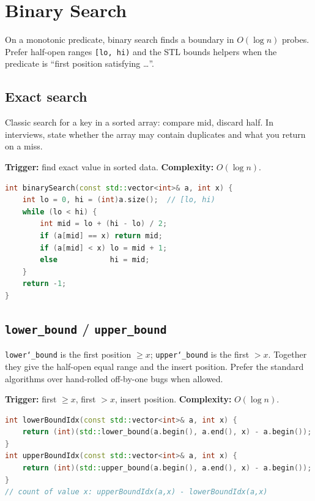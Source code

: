 \section{Binary Search}
\label{sec:pat-binary-search}
On a monotonic predicate, binary search finds a boundary in $O(\log n)$ probes.
Prefer half-open ranges \texttt{[lo, hi)} and the STL bounds helpers when the
predicate is ``first position satisfying \ldots''.

\subsection{Exact search}
\label{subsec:pat-bs-exact}
Classic search for a key in a sorted array: compare mid, discard half. In
interviews, state whether the array may contain duplicates and what you return
on a miss.

\textbf{Trigger:} find exact value in sorted data.
\newline
\textbf{Complexity:} $O(\log n)$.

\begin{lstlisting}[language=C++]
int binarySearch(const std::vector<int>& a, int x) {
    int lo = 0, hi = (int)a.size();  // [lo, hi)
    while (lo < hi) {
        int mid = lo + (hi - lo) / 2;
        if (a[mid] == x) return mid;
        if (a[mid] < x) lo = mid + 1;
        else            hi = mid;
    }
    return -1;
}
\end{lstlisting}

\subsection{\texttt{lower\_bound} / \texttt{upper\_bound}}
\label{subsec:pat-bs-bounds}
\texttt{lower\char`_bound} is the first position $\ge x$; \texttt{upper\char`_bound}
is the first $> x$. Together they give the half-open equal range and the insert
position. Prefer the standard algorithms over hand-rolled off-by-one bugs when
allowed.

\textbf{Trigger:} first $\ge x$, first $> x$, insert position.
\newline
\textbf{Complexity:} $O(\log n)$.

\begin{lstlisting}[language=C++]
int lowerBoundIdx(const std::vector<int>& a, int x) {
    return (int)(std::lower_bound(a.begin(), a.end(), x) - a.begin());
}
int upperBoundIdx(const std::vector<int>& a, int x) {
    return (int)(std::upper_bound(a.begin(), a.end(), x) - a.begin());
}
// count of value x: upperBoundIdx(a,x) - lowerBoundIdx(a,x)
\end{lstlisting}

